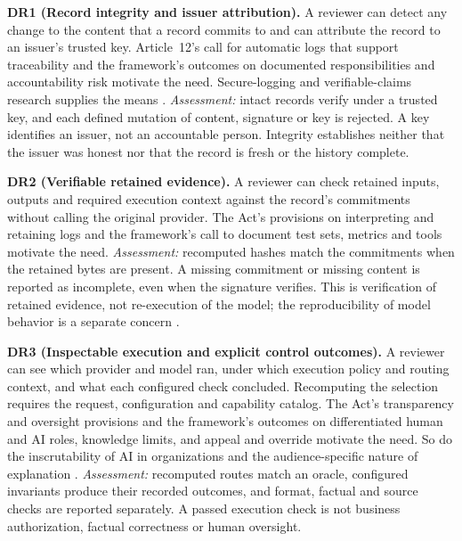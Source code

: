 \documentclass[11pt]{article}
\begin{document}
\textbf{DR1 (Record integrity and issuer attribution).} A reviewer can detect any change to the content that a record commits to and can attribute the record to an issuer's trusted key. Article~12's call for automatic logs that support traceability \citep[Art.~12(1--2)]{euai2026text} and the framework's outcomes on documented responsibilities and accountability risk \citep[GOVERN~2.1, MEASURE~2.8]{nist2023} motivate the need. Secure-logging and verifiable-claims research supplies the means \citep{schneier1999,crosby2009,brundage2020}. \emph{Assessment:} intact records verify under a trusted key, and each defined mutation of content, signature or key is rejected. A key identifies an issuer, not an accountable person. Integrity establishes neither that the issuer was honest nor that the record is fresh or the history complete.

\textbf{DR2 (Verifiable retained evidence).} A reviewer can check retained inputs, outputs and required execution context against the record's commitments without calling the original provider. The Act's provisions on interpreting and retaining logs \citep[Arts.~13(3)(f), 19(1), 26(6)]{euai2026text} and the framework's call to document test sets, metrics and tools \citep[MEASURE~2.1]{nist2023} motivate the need. \emph{Assessment:} recomputed hashes match the commitments when the retained bytes are present. A missing commitment or missing content is reported as incomplete, even when the signature verifies. This is verification of retained evidence, not re-execution of the model; the reproducibility of model behavior is a separate concern \citep{raji2020,kapoor2023}.

\textbf{DR3 (Inspectable execution and explicit control outcomes).} A reviewer can see which provider and model ran, under which execution policy and routing context, and what each configured check concluded. Recomputing the selection requires the request, configuration and capability catalog. The Act's transparency and oversight provisions \citep[Arts.~13--14, 26(2)]{euai2026text} and the framework's outcomes on differentiated human and AI roles, knowledge limits, and appeal and override \citep[GOVERN~3.2, MAP~2.2, MANAGE~4.1]{nist2023} motivate the need. So do the inscrutability of AI in organizations \citep{berente2021} and the audience-specific nature of explanation \citep{felzmann2019}. \emph{Assessment:} recomputed routes match an oracle, configured invariants produce their recorded outcomes, and format, factual and source checks are reported separately. A passed execution check is not business authorization, factual correctness or human oversight.
\end{document}
